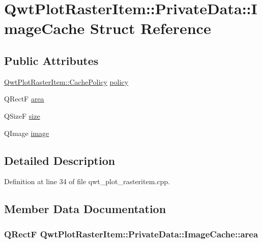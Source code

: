 \hypertarget{struct_qwt_plot_raster_item_1_1_private_data_1_1_image_cache}{\section{Qwt\-Plot\-Raster\-Item\-:\-:Private\-Data\-:\-:Image\-Cache Struct Reference}
\label{struct_qwt_plot_raster_item_1_1_private_data_1_1_image_cache}
}
\subsection*{Public Attributes}
\begin{DoxyCompactItemize}
\item 
\hyperlink{class_qwt_plot_raster_item_a94929fc4c31c3dab75ee5adcac2d57b0}{Qwt\-Plot\-Raster\-Item\-::\-Cache\-Policy} \hyperlink{struct_qwt_plot_raster_item_1_1_private_data_1_1_image_cache_aab43bb6a7f0f02f4986a2ffe45f324dd}{policy}
\item 
Q\-Rect\-F \hyperlink{struct_qwt_plot_raster_item_1_1_private_data_1_1_image_cache_a5dca9e14b3cd729967521200e74b086f}{area}
\item 
Q\-Size\-F \hyperlink{struct_qwt_plot_raster_item_1_1_private_data_1_1_image_cache_a6c45e03703a65b4620c0c61b57f01ca1}{size}
\item 
Q\-Image \hyperlink{struct_qwt_plot_raster_item_1_1_private_data_1_1_image_cache_ac5a579f093728f9fbe4ce0810294d6a4}{image}
\end{DoxyCompactItemize}


\subsection{Detailed Description}


Definition at line 34 of file qwt\-\_\-plot\-\_\-rasteritem.\-cpp.



\subsection{Member Data Documentation}
\hypertarget{struct_qwt_plot_raster_item_1_1_private_data_1_1_image_cache_a5dca9e14b3cd729967521200e74b086f}{
\subsubsection[{area}]{\setlength{\rightskip}{0pt plus 5cm}Q\-Rect\-F Qwt\-Plot\-Raster\-Item\-::\-Private\-Data\-::\-Image\-Cache\-::area}}\label{struct_qwt_plot_raster_item_1_1_private_data_1_1_image_cache_a5dca9e14b3cd729967521200e74b086f}


